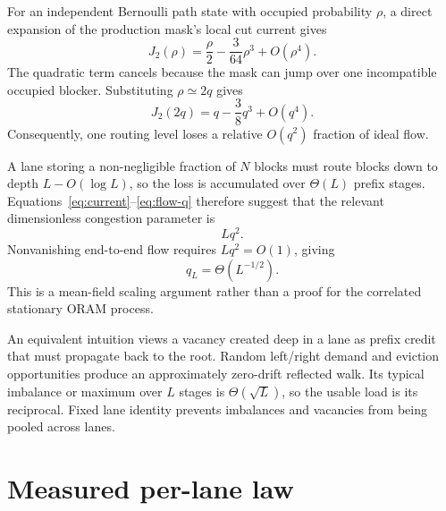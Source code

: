 \documentclass[11pt]{article}
\begin{document}
For an independent Bernoulli path state with occupied probability $\rho$, a
direct expansion of the production mask's local cut current gives
\begin{equation}
\label{eq:current}
  J_2(\rho)
  =\frac{\rho}{2}-\frac{3}{64}\rho^3+O(\rho^4).
\end{equation}
The quadratic term cancels because the mask can jump over one incompatible
occupied blocker.  Substituting $\rho\simeq2q$ gives
\begin{equation}
\label{eq:flow-q}
  J_2(2q)=q-\frac{3}{8}q^3+O(q^4).
\end{equation}
Consequently, one routing level loses a relative $O(q^2)$ fraction of ideal
flow.

A lane storing a non-negligible fraction of $N$ blocks must route blocks down
to depth $L-O(\log L)$, so the loss is accumulated over $\Theta(L)$ prefix
stages.  Equations~\eqref{eq:current}--\eqref{eq:flow-q} therefore suggest
that the relevant dimensionless congestion parameter is
\[
  Lq^2.
\]
Nonvanishing end-to-end flow requires $Lq^2=O(1)$, giving
\begin{equation}
\label{eq:sqrt-law}
  q_L=\Theta(L^{-1/2}).
\end{equation}
This is a mean-field scaling argument rather than a proof for the correlated
stationary ORAM process.

An equivalent intuition views a vacancy created deep in a lane as prefix
credit that must propagate back to the root.  Random left/right demand and
eviction opportunities produce an approximately zero-drift reflected walk.
Its typical imbalance or maximum over $L$ stages is $\Theta(\sqrt L)$, so the
usable load is its reciprocal.  Fixed lane identity prevents imbalances and
vacancies from being pooled across lanes.

\section{Measured per-lane law}
\end{document}

